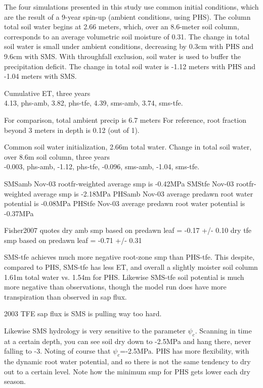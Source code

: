 \documentclass[draft,linenumbers]{agujournal}
\begin{document}
The four simulations presented in this study use common initial conditions, which are the result of a 9-year spin-up (ambient conditions, using PHS).
The column total soil water begins at 2.66 meters, which, over an 8.6-meter soil column, corresponds to an average volumetric soil moisture of 0.31.
The change in total soil water is small under ambient conditions, decreasing by 0.3cm with PHS and 9.6cm with SMS.
With throughfall exclusion, soil water is used to buffer the precipitation deficit.
The change in total soil water is -1.12 meters with PHS and -1.04 meters with SMS.



Cumulative ET, three years \\
    4.13, phs-amb,
    3.82, phs-tfe,
    4.39, sms-amb,
    3.74, sms-tfe.

For comparison, total ambient precip is 6.7 meters
For reference, root fraction beyond 3 meters in depth is 0.12 (out of 1).

Common soil water initialization, 2.66m total water. Change in total soil water, over 8.6m soil column, three years \\
   -0.003, phs-amb,
   -1.12, phs-tfe,
   -0.096, sms-amb,
   -1.04, sms-tfe.

SMSamb Nov-03 rootfr-weighted average smp is -0.42MPa
SMStfe Nov-03 rootfr-weighted average smp is -2.18MPa
PHSamb Nov-03 average predawn root water potential is -0.08MPa
PHStfe Nov-03 average predawn root water potential is -0.37MPa

Fisher2007 quotes dry amb smp based on predawn leaf = -0.17 +/- 0.10
dry tfe smp based on predawn leaf = -0.71 +/- 0.31

SMS-tfe achieves much more negative root-zone smp than PHS-tfe.
This despite, compared to PHS, SMS-tfe has less ET, and overall a slightly moister soil column 1.61m total water vs. 1.54m for PHS.
Likewise SMS-tfe soil potential is much more negative than observations, though the model run does have more transpiration than observed in sap flux.

2003 TFE sap flux is 
SMS is pulling way too hard.

Likewise SMS hydrology is very sensitive to the parameter $\psi_c$. 
Scanning in time at a certain depth, you can see soil dry down to -2.5MPa and hang there, never falling to -3.
Noting of course that $\psi_c$=-2.5MPa.
PHS has more flexibility, with the dynamic root water potential, and so there is not the same tendency to dry out to a certain level.
Note how the minimum smp for PHS gets lower each dry season.
\end{document}
